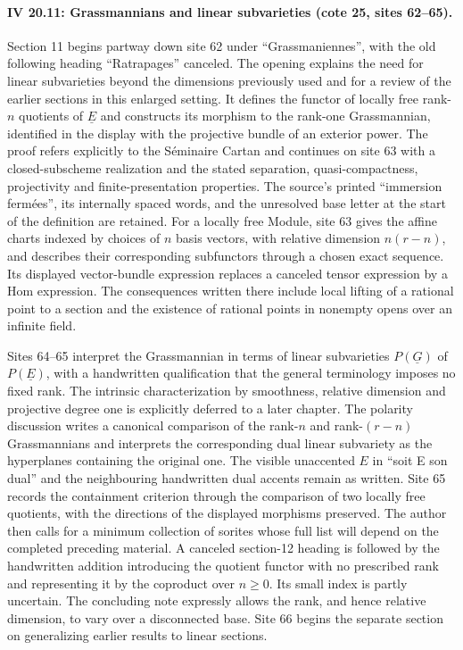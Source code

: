 \paragraph{IV 20.11: Grassmannians and linear subvarieties (cote 25, sites 62--65).}
Section 11 begins partway down site 62 under ``Grassmaniennes'', with the old following heading ``Ratrapages'' canceled. The opening explains the need for linear subvarieties beyond the dimensions previously used and for a review of the earlier sections in this enlarged setting. It defines the functor of locally free rank-$n$ quotients of $\underline E$ and constructs its morphism to the rank-one Grassmannian, identified in the display with the projective bundle of an exterior power. The proof refers explicitly to the S\'eminaire Cartan and continues on site 63 with a closed-subscheme realization and the stated separation, quasi-compactness, projectivity and finite-presentation properties. The source's printed ``immersion ferm\'ees'', its internally spaced words, and the unresolved base letter at the start of the definition are retained. For a locally free Module, site 63 gives the affine charts indexed by choices of $n$ basis vectors, with relative dimension $n(r-n)$, and describes their corresponding subfunctors through a chosen exact sequence. Its displayed vector-bundle expression replaces a canceled tensor expression by a Hom expression. The consequences written there include local lifting of a rational point to a section and the existence of rational points in nonempty opens over an infinite field.

Sites 64--65 interpret the Grassmannian in terms of linear subvarieties $P(\underline G)$ of $P(\underline E)$, with a handwritten qualification that the general terminology imposes no fixed rank. The intrinsic characterization by smoothness, relative dimension and projective degree one is explicitly deferred to a later chapter. The polarity discussion writes a canonical comparison of the rank-$n$ and rank-$(r-n)$ Grassmannians and interprets the corresponding dual linear subvariety as the hyperplanes containing the original one. The visible unaccented $E$ in ``soit E son dual'' and the neighbouring handwritten dual accents remain as written. Site 65 records the containment criterion through the comparison of two locally free quotients, with the directions of the displayed morphisms preserved. The author then calls for a minimum collection of sorites whose full list will depend on the completed preceding material. A canceled section-12 heading is followed by the handwritten addition introducing the quotient functor with no prescribed rank and representing it by the coproduct over $n\geq0$. Its small index is partly uncertain. The concluding note expressly allows the rank, and hence relative dimension, to vary over a disconnected base. Site 66 begins the separate section on generalizing earlier results to linear sections.
